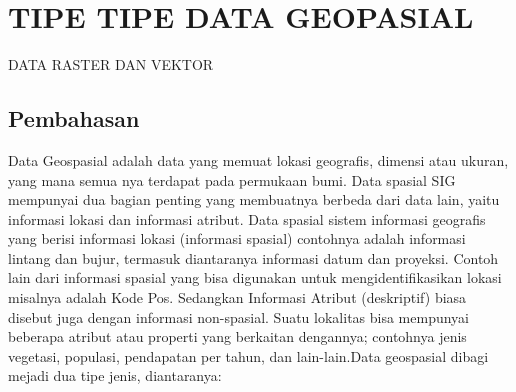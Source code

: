 \section{TIPE TIPE DATA GEOPASIAL}
DATA RASTER DAN VEKTOR
\subsection{Pembahasan}
Data Geospasial adalah data yang memuat lokasi geografis, dimensi atau ukuran, yang mana semua nya terdapat pada permukaan bumi. Data spasial SIG mempunyai dua bagian penting yang membuatnya berbeda dari data lain, yaitu informasi lokasi dan informasi atribut. Data spasial sistem informasi geografis yang berisi informasi lokasi (informasi spasial) contohnya adalah informasi lintang dan bujur, termasuk diantaranya informasi datum dan proyeksi. Contoh lain dari informasi spasial yang bisa digunakan untuk mengidentifikasikan lokasi misalnya adalah Kode Pos. Sedangkan Informasi Atribut (deskriptif) biasa disebut juga dengan informasi non-spasial. Suatu lokalitas bisa mempunyai beberapa atribut atau properti yang berkaitan dengannya; contohnya jenis vegetasi, populasi, pendapatan per tahun, dan lain-lain.\cite{prasetyo2018estimasi}Data geospasial dibagi mejadi dua tipe jenis, diantaranya:

